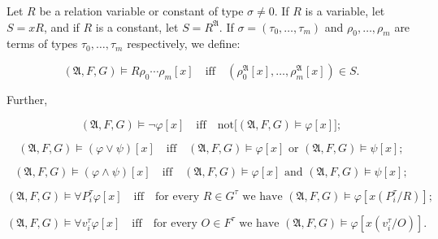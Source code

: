 Let $R$ be a relation variable or constant of type $\sigma \neq 0$. If $R$ is a variable, let $S = xR$, and if $R$ is a constant, let $S = R^{\mathfrak{A}}$. If $\sigma = (\tau_0, \ldots, \tau_m)$ and $\rho_0, \ldots, \rho_m$ are terms of types $\tau_0, \ldots, \tau_m$ respectively, we define:

$$(\mathfrak{A}, F, G) \models R\rho_0 \cdots \rho_m[x] \quad \text{iff} \quad (\rho_0^{\mathfrak{A}}[x], \ldots, \rho_m^{\mathfrak{A}}[x]) \in S.$$

Further,

$$(\mathfrak{A}, F, G) \models \neg\varphi[x] \quad \text{iff} \quad \text{not}\big[(\mathfrak{A}, F, G) \models \varphi[x]\big];$$

$$(\mathfrak{A}, F, G) \models (\varphi \lor \psi)[x] \quad \text{iff} \quad (\mathfrak{A}, F, G) \models \varphi[x] \text{ or } (\mathfrak{A}, F, G) \models \psi[x];$$

$$(\mathfrak{A}, F, G) \models (\varphi \land \psi)[x] \quad \text{iff} \quad (\mathfrak{A}, F, G) \models \varphi[x] \text{ and } (\mathfrak{A}, F, G) \models \psi[x];$$

$$(\mathfrak{A}, F, G) \models \forall P_i^{\tau}\varphi[x] \quad \text{iff} \quad \text{for every } R \in G^{\tau} \text{ we have } (\mathfrak{A}, F, G) \models \varphi[x(P_i^{\tau}/R)];$$

$$(\mathfrak{A}, F, G) \models \forall v_i^{\tau}\varphi[x] \quad \text{iff} \quad \text{for every } O \in F^{\tau} \text{ we have } (\mathfrak{A}, F, G) \models \varphi[x(v_i^{\tau}/O)].$$

